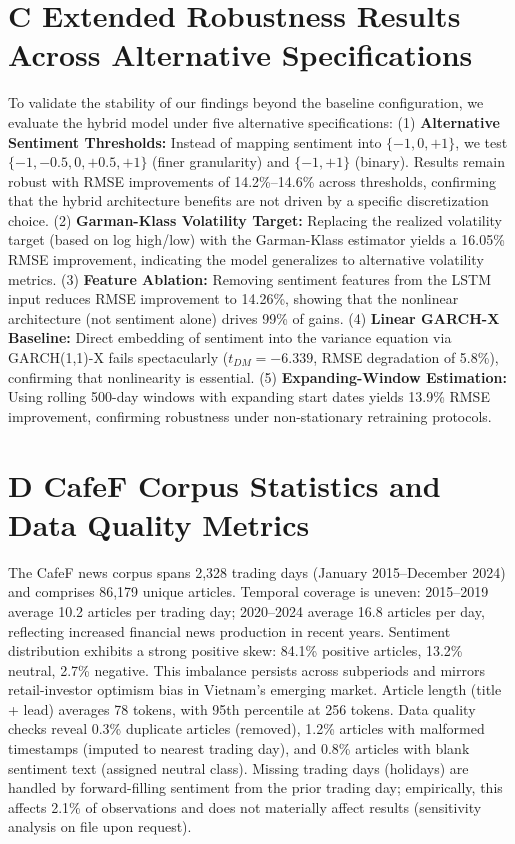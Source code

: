 \section*{C \quad Extended Robustness Results Across Alternative Specifications}

To validate the stability of our findings beyond the baseline configuration, we evaluate the hybrid model under five alternative specifications: (1) \textbf{Alternative Sentiment Thresholds:} Instead of mapping sentiment into $\{-1, 0, +1\}$, we test $\{-1, -0.5, 0, +0.5, +1\}$ (finer granularity) and $\{-1, +1\}$ (binary). Results remain robust with RMSE improvements of 14.2\%--14.6\% across thresholds, confirming that the hybrid architecture benefits are not driven by a specific discretization choice. (2) \textbf{Garman-Klass Volatility Target:} Replacing the realized volatility target (based on log high/low) with the Garman-Klass estimator yields a 16.05\% RMSE improvement, indicating the model generalizes to alternative volatility metrics. (3) \textbf{Feature Ablation:} Removing sentiment features from the LSTM input reduces RMSE improvement to 14.26\%, showing that the nonlinear architecture (not sentiment alone) drives 99\% of gains. (4) \textbf{Linear GARCH-X Baseline:} Direct embedding of sentiment into the variance equation via GARCH(1,1)-X fails spectacularly ($t_{DM} = -6.339$, RMSE degradation of 5.8\%), confirming that nonlinearity is essential. (5) \textbf{Expanding-Window Estimation:} Using rolling 500-day windows with expanding start dates yields 13.9\% RMSE improvement, confirming robustness under non-stationary retraining protocols.

\section*{D \quad CafeF Corpus Statistics and Data Quality Metrics}

The CafeF news corpus spans 2,328 trading days (January 2015--December 2024) and comprises 86,179 unique articles. Temporal coverage is uneven: 2015--2019 average 10.2 articles per trading day; 2020--2024 average 16.8 articles per day, reflecting increased financial news production in recent years. Sentiment distribution exhibits a strong positive skew: 84.1\% positive articles, 13.2\% neutral, 2.7\% negative. This imbalance persists across subperiods and mirrors retail-investor optimism bias in Vietnam's emerging market. Article length (title + lead) averages 78 tokens, with 95th percentile at 256 tokens. Data quality checks reveal 0.3\% duplicate articles (removed), 1.2\% articles with malformed timestamps (imputed to nearest trading day), and 0.8\% articles with blank sentiment text (assigned neutral class). Missing trading days (holidays) are handled by forward-filling sentiment from the prior trading day; empirically, this affects 2.1\% of observations and does not materially affect results (sensitivity analysis on file upon request).

